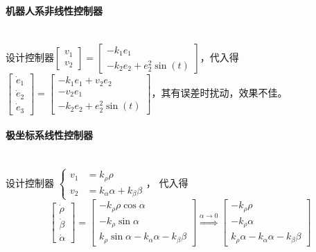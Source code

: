 \documentclass[
12pt, %
a4paper, 
oneside, %
headinclude,footinclude, %
]{scrartcl}
\begin{document}
\paragraph{机器人系非线性控制器}~\\

设计控制器$ \begin{bmatrix} v_1 \\ v_2 \end{bmatrix} = \begin{bmatrix} -k_1 e_1 \\ -k_2 e_2 + e_2^2 \sin(t) \end{bmatrix} $，代入得$ \begin{bmatrix} \dot{e}_1 \\ \dot{e}_2 \\ \dot{e}_3 \end{bmatrix} = \begin{bmatrix} -k_1 e_1 + v_2 e_2 \\ -v_2 e_1 \\ -k_2 e_2 + e_2^2 \sin(t) \end{bmatrix} $，其有误差时扰动，效果不佳。
\paragraph{极坐标系线性控制器}~\\

设计控制器%
$ 
\begin{cases}
v_1 &= k_\rho \rho \\
v_2 &= k_\alpha \alpha + k_\beta \beta
\end{cases}
$，%
代入得
$$ 
\begin{bmatrix} \dot{\rho} \\ \dot{\beta} \\ \dot{\alpha} \end{bmatrix} 
= \begin{bmatrix} -k_\rho \rho \cos\alpha \\ -k_\rho \sin\alpha \\ k_\rho \sin\alpha - k_\alpha \alpha - k_\beta \beta \end{bmatrix} 
\overset{\alpha \to 0}{\Longrightarrow}
\begin{bmatrix} -k_\rho \rho \\ -k_\rho \alpha \\ k_\rho \alpha - k_\alpha \alpha - k_\beta \beta \end{bmatrix} 
$$
\end{document}
